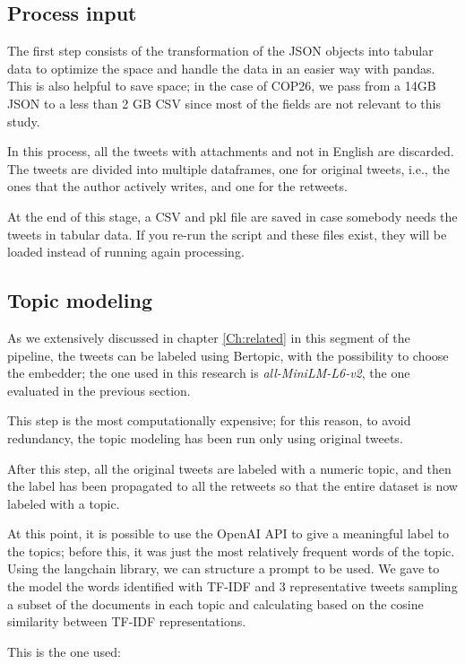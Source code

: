 \subsection{Process input}

The first step consists of the transformation of the JSON objects into tabular data to optimize the space and handle the data in an easier way with pandas. This is also helpful to save space; in the case of COP26, we pass from a 14GB JSON to a less than 2 GB CSV since most of the fields are not relevant to this study.

In this process, all the tweets with attachments and not in English are discarded. The tweets are divided into multiple dataframes, one for original tweets, i.e., the ones that the author actively writes, and one for the retweets.

At the end of this stage, a CSV and pkl file are saved in case somebody needs the tweets in tabular data.  If you re-run the script and these files exist, they will be loaded instead of  running again processing.

\subsection{Topic modeling}

As we extensively discussed in chapter \ref{Ch:related} in this segment of the pipeline, the tweets can be labeled using Bertopic, with the possibility to choose the embedder; the one used in this research is \textit{all-MiniLM-L6-v2}, the one evaluated in the previous section.

This step is the most computationally expensive; for this reason, to avoid redundancy, the topic modeling has been run only using original tweets. 

After this step, all the original tweets are labeled with a numeric topic, and then the label has been propagated to all the retweets so that the entire dataset is now labeled with a topic.

At this point, it is possible to use the OpenAI API to give a meaningful label to the topics; before this, it was just the most relatively frequent words of the topic. Using the langchain library, we can structure a prompt to be used.  We gave to the model the words identified with TF-IDF and 3 representative tweets sampling a subset of the documents in each topic and calculating  based on the cosine similarity between TF-IDF representations.

This is the one used: 
\\

